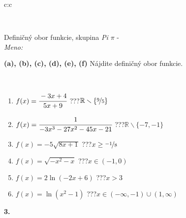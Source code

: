 \documentclass[10pt]{report}
\begin{document}
\begin{tabular}{c:c}
\begin{minipage}[c][104.5mm][t]{0.5\linewidth}
\begin{center}
\begin{minipage}{0.20\linewidth}
\begin{center}
\end{center}
\end{minipage}
\end{center}
\end{minipage}
\\ \hdashline
\begin{minipage}[c][104.5mm][t]{0.5\linewidth}
\begin{center}
\vspace{7mm}
{\huge Definičný obor funkcie, skupina \textit{Pi $\pi$} -}\\[5mm]
\textit{Meno:}\phantom{xxxxxxxxxxxxxxxxxxxxxxxxxxxxxxxxxxxxxxxxxxxxxxxxxxxxxxxxxxxxxxxxx}\\[5mm]
\begin{minipage}{0.95\linewidth}
\begin{center}
{
\textbf{(a), (b), (c), (d), (e), (f)} Nájdite definičný obor funkcie. \\[1mm]
\phantom{x}
}
\end{center}
\end{minipage}
\\[4mm]
\begin{minipage}{0.79\linewidth}
\begin{center}
\begin{varwidth}{\linewidth}
\begin{enumerate}
\normalsizerrr
\item $f(x)=\cfrac{-3x+4}{5x+9}$\quad \dotfill\; ???\;\dotfill \quad $ \mathbb{R} \smallsetminus\{\nicefrac{9}{5} \}$
\item $f(x)=\cfrac{1}{-3x^3-27x^2-45x-21}$\quad \dotfill\; ???\;\dotfill \quad $ \mathbb{R} \smallsetminus\{-7,-1 \}$
\item $f(x)=-5\sqrt{8x+1}$\quad \dotfill\; ???\;\dotfill \quad $x\geq\nicefrac{-1}{8}$
\item $f(x)=\sqrt{-x^2-x}$\quad \dotfill\; ???\;\dotfill \quad $x\in(-1 , 0)$
\item $f(x)=2\ln{(-2x+6)}$\quad \dotfill\; ???\;\dotfill \quad $x>3$
\item $f(x)=\ln{(x^2-1)}$\quad \dotfill\; ???\;\dotfill \quad $x\in(-\infty , -1)\cup(1 , \infty)$
\end{enumerate}
\end{varwidth}
\end{center}
\end{minipage}
\begin{minipage}{0.20\linewidth}
\begin{center}
{\Huge\bfseries 3.} \\[2mm]

\end{center}
\end{minipage}
\end{center}
\end{minipage}
\end{tabular}
\end{document}
